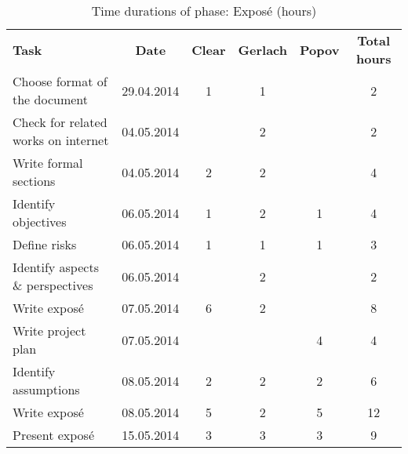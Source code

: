 \begin{table}[H]
\renewcommand{\arraystretch}{1.6}
\begin{threeparttable}

  \caption{Time durations of phase: Expos\'{e} (hours)}
  
  \begin{tabular}{p{3cm} c|c c c| c}
      \textbf{Task} & \textbf{Date}& \textbf{Clear} & \textbf{Gerlach} & \textbf{Popov} & \textbf{Total hours} \\
		Choose format of the document
        				& 29.04.2014 & 1 	& 1 	& 	 	& 2  \\                 	  Check for related works on internet
                        & 04.05.2014 & 		& 2		&		& 2  \\
        Write formal sections 
                        & 04.05.2014 & 2 	& 2 	&  		& 4 \\ 
        Identify objectives
        				& 06.05.2014 & 1 	& 2 	& 1 	& 4 \\ 
        Define risks
        				& 06.05.2014 & 1 	& 1 	& 1 	& 3 \\ 
        Identify aspects \& perspectives
        				& 06.05.2014 &  	& 2 	&   	& 2 \\ 
        Write expos\'{e}& 07.05.2014 & 6	& 2		&  		& 8\\ 
        Write project plan
        				& 07.05.2014 &  	&  		& 4 	& 4 \\ 
        Identify assumptions
        				& 08.05.2014 & 2	& 2		& 2		& 6 \\
        Write expos\'{e}& 08.05.2014 & 5	& 2		& 5 	& 12  \\ 
        
        Present expos\'{e}
        				& 15.05.2014 & 3	& 3		& 3		& 9 \\

  \end{tabular}

\end{threeparttable}

\end{table}

